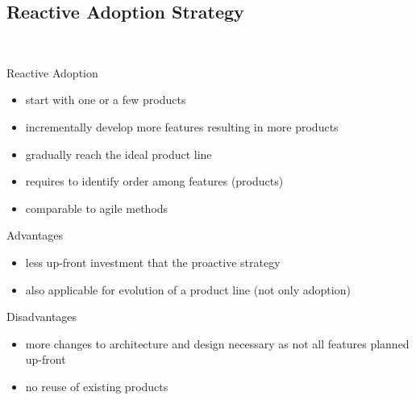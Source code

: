 \subsection{Reactive Adoption Strategy}
\begin{frame}{\myframetitle\ }
	\begin{mycolumns}[animation=none]
		\begin{definition}{Reactive Adoption}
			\begin{itemize}
				\item start with one or a few products
				\item incrementally develop more features resulting in more products
				\item gradually reach the ideal product line
				\item requires to identify order among features (products)
				\item comparable to agile methods
			\end{itemize}
		\end{definition}
	\mynextcolumn
		\begin{note}{Advantages}
			\begin{itemize}
				\item less up-front investment that the proactive strategy
				\item also applicable for evolution of a product line (not only adoption)
			\end{itemize}
		\end{note}
		\begin{note}{Disadvantages}
			\begin{itemize}
				\item more changes to architecture and design necessary as not all features planned up-front
				\item no reuse of existing products
			\end{itemize}
		\end{note}
	\end{mycolumns}
\end{frame}

